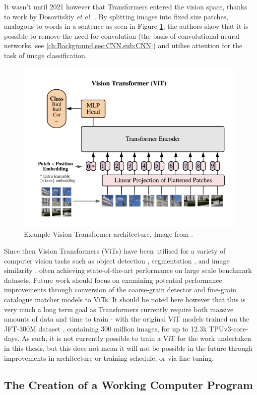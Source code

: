 It wasn't until 2021 however that Transformers entered the vision space, thanks to work by Dosovitskiy \textit{et al.} \cite{dosovitskiy_image_2021}. By splitting images into fixed size patches, analogous to words in a sentence as seen in Figure \ref{fig:vit}, the authors show that it is possible to remove the need for convolution (the basis of convolutional neural networks, see \ref{ch:Background,sec:CNN,sub:CNN}) and utilise attention for the task of image classification. 

\begin{figure}[h]
	\begin{center}
		\includegraphics[scale=0.7]{Chapter7/figs/vit.png}
	\end{center}
	\caption{Example Vision Transformer architecture. Image from \cite{dosovitskiy_image_2021}.}
	\label{fig:vit}
\end{figure}

Since then Vision Transformers (ViTs) have been utilised for a variety of computer vision tasks such as object detection \cite{fang_you_2021, li_exploring_2022}, segmentation \cite{hu_istr_2021, prangemeier_attention-based_2020, wang_end--end_2021}, and image similarity \cite{el-nouby_training_2021}, often achieving state-of-the-art performance on large scale benchmark datasets. Future work should focus on examining potential performance improvements through conversion of the coarse-grain detector and fine-grain catalogue matcher models to ViTs. It should be noted here however that this is very much a long term goal as Transformers currently require both massive amounts of data and time to train - with the original ViT models trained on the JFT-300M dataset \cite{sun_revisiting_2017}, containing 300 million images, for up to 12.3k TPUv3-core-days. As such, it is not currently possible to train a ViT for the work undertaken in this thesis, but this does not mean it will not be possible in the future through improvements in architecture or training schedule, or via fine-tuning.

\subsection{The Creation of a Working Computer Program}\label{ch:Conclusion,sec:FutureWork,sub:GUI}




